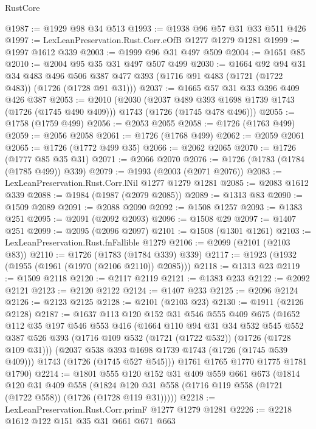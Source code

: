 \begin{lexlean}{RustCore}
\begin{coremodule}
@1987 := @1929 @98 @34 @513
@1993 := @1938 @96 @57 @31 @33 @511 @426
@1997 := LexLeanPreservation.Rust.Corr.eOfB @1277 @1279 @1281
@1999 := @1997 @1612 @339
@2003 := @1999 @96 @31 @497 @509
@2004 := @1651 @85
@2010 := @2004 @95 @35 @31 @497 @507 @499
@2030 := @1664
    @92
    @94
    @31
    @34
    @483
    @496
    @506
    @387
    @477
    @393
    (@1716 @91 @483 (@1721 (@1722 @483)) (@1726 (@1728 @91 @31)))
@2037 := @1665 @57 @31 @33 @396 @409 @426 @387
@2053 := @2010
    (@2030
      (@2037 @489 @393 @1698 @1739 @1743 (@1726 (@1745 @490 @409)))
      @1743
      (@1726 (@1745 @478 @496)))
@2055 := @1758 (@1759 @499)
@2056 := @2053 @2055
@2058 := @1726 (@1763 @499)
@2059 := @2056 @2058
@2061 := @1726 (@1768 @499)
@2062 := @2059 @2061
@2065 := @1726 (@1772 @499 @35)
@2066 := @2062 @2065
@2070 := @1726 (@1777 @85 @35 @31)
@2071 := @2066 @2070
@2076 := @1726 (@1783 (@1784 (@1785 @499)) @339)
@2079 := @1993 (@2003 (@2071 @2076))
@2083 := LexLeanPreservation.Rust.Corr.lNil @1277 @1279 @1281
@2085 := @2083 @1612 @339
@2088 := @1984 (@1987 (@2079 @2085))
@2089 := @1313 @83
@2090 := @1509 @2089
@2091 := @2088 @2090
@2092 := @1508 @1257
@2093 := @1383 @251
@2095 := @2091 (@2092 @2093)
@2096 := @1508 @29
@2097 := @1407 @251
@2099 := @2095 (@2096 @2097)
@2101 := @1508 (@1301 @1261)
@2103 := LexLeanPreservation.Rust.fnFallible @1279
@2106 := @2099 (@2101 (@2103 @83))
@2110 := @1726 (@1783 (@1784 @339) @339)
@2117 := @1923 (@1932 (@1955 (@1961 (@1970 (@2106 @2110)) @2085)))
@2118 := @1313 @23
@2119 := @1509 @2118
@2120 := @2117 @2119
@2121 := @1383 @233
@2122 := @2092 @2121
@2123 := @2120 @2122
@2124 := @1407 @233
@2125 := @2096 @2124
@2126 := @2123 @2125
@2128 := @2101 (@2103 @23)
@2130 := @1911 (@2126 @2128)
@2187 := @1637
    @113
    @120
    @152
    @31
    @546
    @555
    @409
    @675
    (@1652
      @112
      @35
      @197
      @546
      @553
      @416
      (@1664
        @110
        @94
        @31
        @34
        @532
        @545
        @552
        @387
        @526
        @393
        (@1716 @109 @532 (@1721 (@1722 @532)) (@1726 (@1728 @109 @31)))
        (@2037 @538 @393 @1698 @1739 @1743 (@1726 (@1745 @539 @409)))
        @1743
        (@1726 (@1745 @527 @545)))
      @1761
      @1765
      @1770
      @1775
      @1781
      @1790)
@2214 := @1801
    @555
    @120
    @152
    @31
    @409
    @559
    @661
    @673
    (@1814
      @120
      @31
      @409
      @558
      (@1824 @120 @31 @558 (@1716 @119 @558 (@1721 (@1722 @558)) (@1726 (@1728 @119 @31)))))
@2218 := LexLeanPreservation.Rust.Corr.primF @1277 @1279 @1281
@2226 := @2218 @1612 @122 @151 @35 @31 @661 @671 @663

\end{coremodule}
\end{lexlean}
